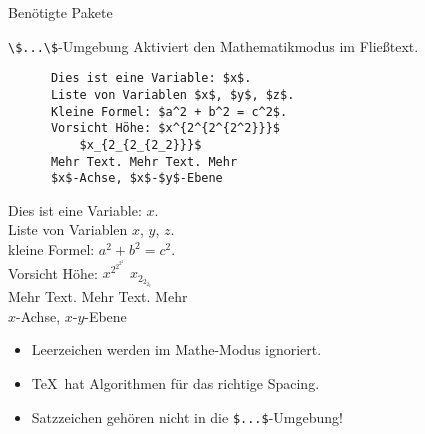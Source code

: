 \begin{frame}[fragile,t]{
  Benötigte Pakete
  \hfill{}
}
  \hfill{}

  \vspace{5pt}
\end{frame}

\begin{frame}[fragile]{\lstinline+\$...\$+-Umgebung}
  Aktiviert den Mathematikmodus im Fließtext.

  \begin{CodeExample}{0.56}
    \begin{lstlisting}
      Dies ist eine Variable: $x$.
      Liste von Variablen $x$, $y$, $z$.
      Kleine Formel: $a^2 + b^2 = c^2$.
      Vorsicht Höhe: $x^{2^{2^{2^2}}}$
          $x_{2_{2_{2_2}}}$
      Mehr Text. Mehr Text. Mehr
      $x$-Achse, $x$-$y$-Ebene
    \end{lstlisting}
  \CodeResult
    Dies ist eine Variable: $x$. \\
    Liste von Variablen $x$, $y$, $z$. \\
    kleine Formel: $a^2 + b^2 = c^2$. \\
    Vorsicht Höhe: $x^{2^{2^{2^2}}}$ $x_{2_{2_{2_2}}}$ \\
    Mehr Text. Mehr Text. Mehr \\
    $x$-Achse, $x$-$y$-Ebene
  \end{CodeExample}

  \vspace{1em}
  \begin{itemize}
    \item Leerzeichen werden im Mathe-Modus ignoriert.
    \item \TeX\ hat Algorithmen für das richtige Spacing.
    \item Satzzeichen gehören nicht in die \lstinline+$...$+-Umgebung!
  \end{itemize}
\end{frame}


